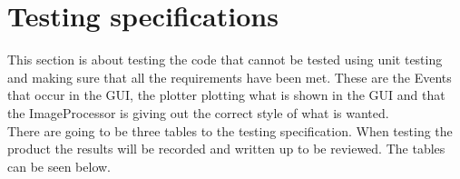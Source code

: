 \documentclass{article}
\begin{document}
    \section{Testing specifications}
This section is about testing the code that cannot be tested using unit testing and making sure that all the requirements have been met. These are the Events that occur in the GUI, the plotter plotting what is shown in the GUI and that the ImageProcessor is giving out the correct style of what is wanted.\\ \newline
There are going to be three tables to the testing specification. When testing the product the results will be recorded and written up to be reviewed. The tables can be seen below.\\ \newline
\clearpage
\end{document}
